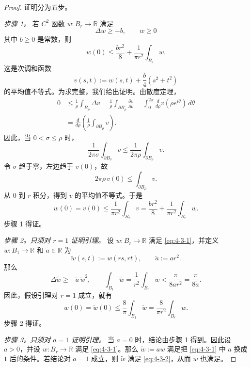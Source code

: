 \begin{proof}
证明分为五步。

\smallskip
\noindent\textit{步骤 1。}
若 $C^2$ 函数 $w:B_r\to\mathbb R$ 满足
\[
  \Delta w\ge-b,\qquad w\ge0
\]
其中 $b\ge0$ 是常数，则
\[
  w(0)\le\frac{br^2}{8}+\frac{1}{\pi r^2}\int_{B_r}w.
\]
这是次调和函数
\[
  v(s,t):=w(s,t)+\frac b4(s^2+t^2)
\]
的平均值不等式。为求完整，我们给出证明。由散度定理，
\[
\begin{aligned}
  0
  &\le\frac1\rho\int_{B_\rho}\Delta v
   =\frac1\rho\int_{\partial B_\rho}\frac{\partial v}{\partial\nu}
   =\int_0^{2\pi}\frac d{d\rho}v(\rho e^{i\theta})\,d\theta \\
  &=\frac d{d\rho}
  \left(\frac1\rho\int_{\partial B_\rho}v\right).
\end{aligned}
\]
因此，当 $0<\sigma\le\rho$ 时，
\[
  \frac{1}{2\pi\sigma}\int_{\partial B_\sigma}v
  \le
  \frac{1}{2\pi\rho}\int_{\partial B_\rho}v.
\]
令 $\sigma$ 趋于零，左边趋于 $v(0)$，故
\[
  2\pi\rho\,v(0)\le\int_{\partial B_\rho}v.
\]
从 $0$ 到 $r$ 积分，得到 $v$ 的平均值不等式。于是
\[
  w(0)=v(0)
  \le\frac{1}{\pi r^2}\int_{B_r}v
  =\frac{br^2}{8}+\frac{1}{\pi r^2}\int_{B_r}w.
\]
步骤 1 得证。

\smallskip
\noindent\textit{步骤 2。只须对 $r=1$ 证明引理。}
设 $w:B_r\to\mathbb R$ 满足 \eqref{eq:4-3-1}，并定义
$\widetilde w:B_1\to\mathbb R$ 和 $\widetilde a\in\mathbb R$ 为
\[
  \widetilde w(s,t):=w(rs,rt),
  \qquad
  \widetilde a:=ar^2.
\]
那么
\[
  \Delta\widetilde w\ge-\widetilde a\,\widetilde w^2,
  \qquad
  \int_{B_1}\widetilde w
  =\frac1{r^2}\int_{B_r}w
  <\frac{\pi}{8ar^2}
  =\frac{\pi}{8\widetilde a}.
\]
因此，假设引理对 $r=1$ 成立，就有
\[
  w(0)=\widetilde w(0)
  \le\frac8\pi\int_{B_1}\widetilde w
  =\frac{8}{\pi r^2}\int_{B_r}w.
\]
步骤 2 得证。

\smallskip
\noindent\textit{步骤 3。只须对 $a=1$ 证明引理。}
当 $a=0$ 时，结论由步骤 1 得到。因此设 $a>0$，并设
$w:B_r\to\mathbb R$ 满足 \eqref{eq:4-3-1}。那么
$\widetilde w:=aw$ 满足把 \eqref{eq:4-3-1} 中 $a$ 换成 $1$ 后的条件。若结论对
$a=1$ 成立，则 $\widetilde w$ 满足 \eqref{eq:4-3-2}，从而 $w$ 也满足。


\end{proof}
